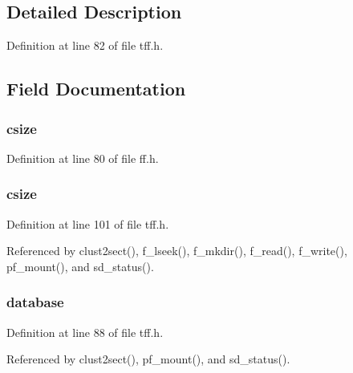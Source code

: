 \subsection{Detailed Description}


Definition at line 82 of file tff.\-h.



\subsection{Field Documentation}
\hypertarget{struct_f_a_t_f_s_a3b73efa3ac006b6f24bf0d317a605d78}{
\subsubsection[{csize}]{ csize}}\label{struct_f_a_t_f_s_a3b73efa3ac006b6f24bf0d317a605d78}


Definition at line 80 of file ff.\-h.

\hypertarget{struct_f_a_t_f_s_af8143a50ac7be72544022dd46a7013da}{
\subsubsection[{csize}]{ csize}}\label{struct_f_a_t_f_s_af8143a50ac7be72544022dd46a7013da}


Definition at line 101 of file tff.\-h.



Referenced by clust2sect(), f\-\_\-lseek(), f\-\_\-mkdir(), f\-\_\-read(), f\-\_\-write(), pf\-\_\-mount(), and sd\-\_\-status().

\hypertarget{struct_f_a_t_f_s_ae3045fb3d76867c0cd17e6513000146b}{
\subsubsection[{database}]{ database}}\label{struct_f_a_t_f_s_ae3045fb3d76867c0cd17e6513000146b}


Definition at line 88 of file tff.\-h.



Referenced by clust2sect(), pf\-\_\-mount(), and sd\-\_\-status().

